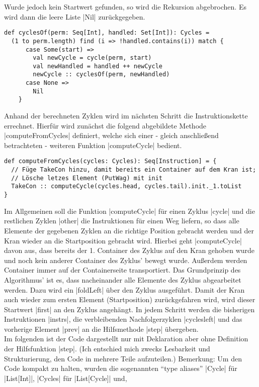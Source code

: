 Wurde jedoch kein Startwert gefunden, so wird die Rekursion abgebrochen.
Es wird dann die leere Liste |Nil| zurückgegeben.
\lstset{language=Scala}
\lstset{basicstyle=\ttfamily\normalsize}
\begin{lstlisting}
def cyclesOf(perm: Seq[Int], handled: Set[Int]): Cycles =
  (1 to perm.length) find (i => !handled.contains(i)) match {
      case Some(start) =>
        val newCycle = cycle(perm, start)
        val newHandled = handled ++ newCycle
        newCycle :: cyclesOf(perm, newHandled)
      case None =>
        Nil
    }
\end{lstlisting}
Anhand der berechneten Zyklen wird im nächsten Schritt die Instruktionskette errechnet.
Hierfür wird zunächst die folgend abgebildete Methode |computeFromCycles| definiert,
welche sich einer - gleich anschließend betrachteten - weiteren Funktion |computeCycle| bedient.
\lstset{basicstyle=\ttfamily\small}
\begin{lstlisting}
def computeFromCycles(cycles: Cycles): Seq[Instruction] = {
  // Füge TakeCon hinzu, damit bereits ein Container auf dem Kran ist;
  // Lösche letzes Element (PutWag) mit init
  TakeCon :: computeCycle(cycles.head, cycles.tail).init._1.toList
}
\end{lstlisting}
\lstset{basicstyle=\ttfamily}
Im Allgemeinen soll die Funktion |computeCycle| für einen Zyklus |cycle| und die restlichen Zyklen |other| die Instruktionen für einen Weg liefern,
so dass alle Elemente der gegebenen Zyklen an die richtige Position gebracht werden und der Kran wieder an die Startposition gebracht wird.
Hierbei geht |computeCycle| davon aus, dass bereits der 1. Container des Zyklus auf den Kran gehoben wurde und noch kein anderer Container des Zyklus' bewegt wurde.
Außerdem werden Container immer auf der Containerseite transportiert.
Das Grundprinzip des Algorithmus' ist es, dass nacheinander alle Elemente des Zyklus abgearbeitet werden.
Dazu wird ein |foldLeft| über den Zyklus ausgeführt.
Damit der Kran auch wieder zum ersten Element (Startposition) zurückgefahren wird, wird dieser Startwert |first| an den Zyklus angehängt.
In jedem Schritt werden die bisherigen Instruktionen |instrs|, die verbleibenden Nachfolgerzyklen |cyclesleft| und das vorherige Element |prev|
an die Hilfsmethode |step| übergeben. \\
Im folgenden ist der Code dargestellt nur mit Deklaration aber ohne Definition der Hilfsfunktion |step|.
(Ich entschied mich zwecks Lesbarkeit und Strukturierung, den Code in mehrere Teile aufzuteilen.)
Bemerkung: Um den Code kompakt zu halten, wurden die sogenannten ``type aliases'' |Cycle| für |List[Int]|, |Cycles| für |List[Cycle]| und,
